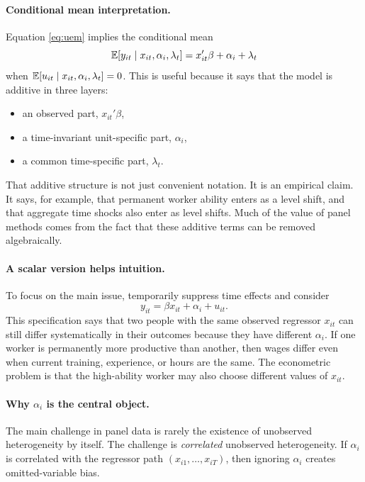 \paragraph{Conditional mean interpretation.}
Equation \eqref{eq:uem} implies the conditional mean
\begin{equation}
\mathbb{E}[y_{it} \mid x_{it}, \alpha_i, \lambda_t] = x_{it}'\beta + \alpha_i + \lambda_t
\label{eq:conditional_mean_uem}
\end{equation}
when $\mathbb{E}[u_{it}\mid x_{it},\alpha_i,\lambda_t]=0$. This is useful because it says that the model is additive in three layers:
\begin{itemize}
\item an observed part, $x_{it}'\beta$,
\item a time-invariant unit-specific part, $\alpha_i$,
\item a common time-specific part, $\lambda_t$.
\end{itemize}

That additive structure is not just convenient notation. It is an empirical claim. It says, for example, that permanent worker ability enters as a level shift, and that aggregate time shocks also enter as level shifts. Much of the value of panel methods comes from the fact that these additive terms can be removed algebraically.

\paragraph{A scalar version helps intuition.}
To focus on the main issue, temporarily suppress time effects and consider
\begin{equation}
y_{it} = \beta x_{it} + \alpha_i + u_{it}.
\label{eq:scalar_uem}
\end{equation}
This specification says that two people with the same observed regressor $x_{it}$ can still differ systematically in their outcomes because they have different $\alpha_i$. If one worker is permanently more productive than another, then wages differ even when current training, experience, or hours are the same. The econometric problem is that the high-ability worker may also choose different values of $x_{it}$.

\paragraph{Why $\alpha_i$ is the central object.}
The main challenge in panel data is rarely the existence of unobserved heterogeneity by itself. The challenge is \emph{correlated} unobserved heterogeneity. If $\alpha_i$ is correlated with the regressor path $(x_{i1},\ldots,x_{iT})$, then ignoring $\alpha_i$ creates omitted-variable bias.

